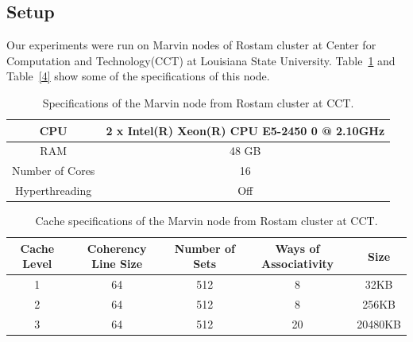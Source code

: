 \subsection{Setup}
Our experiments were run on Marvin nodes of Rostam cluster at Center for Computation and Technology(CCT) at Louisiana State University. Table~\ref{table3} and Table~\ref{4} show some of the specifications of this node.

\vspace{\baselineskip}	
\begin{table}[H]
	\centering
	\scalebox{0.75}
	{\begin{tabular}{|c | c |} 
			\hline
			CPU &  2 x Intel(R) Xeon(R) CPU E5-2450 0 @ 2.10GHz \\ [0.5ex] 
			\hline
			RAM & 48 GB\\ 	
			\hline
			Number of Cores & 16\\
			\hline	
			Hyperthreading & Off \\
			\hline			
	\end{tabular}}	
	\caption{Specifications of the Marvin node from Rostam cluster at CCT.}
	\label{table3}
\end{table} 


\vspace{\baselineskip}	
\begin{table}[H]
	\centering
	\scalebox{0.9}
	{\begin{tabular}{|c | c | c | c | c|} 
			\hline
			Cache Level &  Coherency Line Size & Number of Sets & Ways of Associativity & Size\\ [0.5ex] 
			\hline
			1 & 64 & 512 & 8 & 32KB \\	
			\hline
			2 & 64 & 512 & 8 & 256KB \\
			\hline	
			3 & 64 & 512 & 20 & 20480KB \\
			\hline			
	\end{tabular}}	
	\caption{Cache specifications of the Marvin node from Rostam cluster at CCT.}
	\label{table4}
\end{table} 
\vspace{\baselineskip}	

